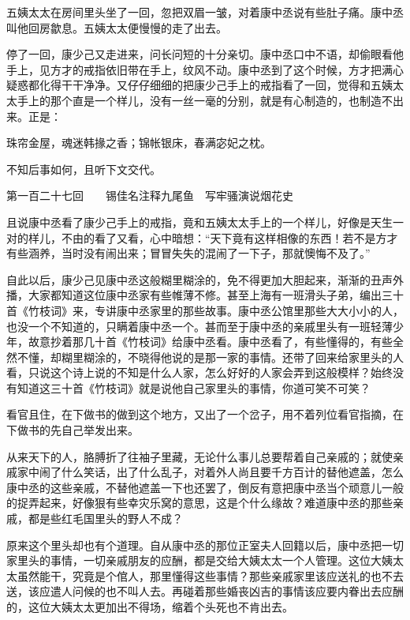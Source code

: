 \documentclass[12pt,UTF8]{ctexbook}
\begin{document}
{{{五姨太太在房间里头坐了一回，忽把双眉一皱，对着康中丞说有些肚子痛。康中丞叫他回房歙息。五姨太太便慢慢的走了出去。

停了一回，康少己又走进来，问长问短的十分亲切。康中丞口中不语，却偷眼看他手上，见方才的戒指依旧带在手上，纹风不动。康中丞到了这个时候，方才把满心疑惑都化得干干净净。又仔仔细细的把康少己手上的戒指看了一回，觉得和五姨太太手上的那个直是一个样儿，没有一丝一毫的分别，就是有心制造的，也制造不出来。正是：

珠帘金屋，魂迷韩掾之香；锦帐银床，春满宓妃之枕。

不知后事如何，且听下文交代。





第一百二十七回　　锡佳名注释九尾鱼　写牢骚演说烟花史





且说康中丞看了康少己手上的戒指，竟和五姨太太手上的一个样儿，好像是天生一对的样儿，不由的看了又看，心中暗想：“天下竟有这样相像的东西！若不是方才有些涵养，当时没有闹出来；冒冒失失的混闹了一下子，那就懊悔不及了。”

自此以后，康少己见康中丞这般糊里糊涂的，免不得更加大胆起来，渐渐的丑声外播，大家都知道这位康中丞家有些帷薄不修。甚至上海有一班滑头子弟，编出三十首《竹枝词》来，专讲康中丞家里的那些故事。康中丞公馆里那些大大小小的人，也没一个不知道的，只瞒着康中丞一个。甚而至于康中丞的亲戚里头有一班轻薄少年，故意抄着那几十首《竹枝词》给康中丞看。康中丞看了，有些懂得的，有些全然不懂，却糊里糊涂的，不晓得他说的是那一家的事情。还带了回来给家里头的人看，只说这个诗上说的不知是什么人家，怎么好好的人家会弄到这般模样？始终没有知道这三十首《竹枝词》就是说他自己家里头的事情，你道可笑不可笑？

看官且住，在下做书的做到这个地方，又出了一个岔子，用不着列位看官指摘，在下做书的先自己举发出来。

从来天下的人，胳膊折了往袖子里藏，无论什么事儿总要帮着自己亲戚的；就使亲戚家中闹了什么笑话，出了什么乱子，对着外人尚且要千方百计的替他遮盖，怎么康中丞的这些亲戚，不替他遮盖一下也还罢了，倒反有意把康中丞当个顽意儿一般的捉弄起来，好像狠有些幸灾乐窝的意思，这是个什么缘故？难道康中丞的那些亲戚，都是些红毛国里头的野人不成？

原来这个里头却也有个道理。自从康中丞的那位正室夫人回籍以后，康中丞把一切家里头的事情，一切亲戚朋友的应酬，都是交给大姨太太一个人管理。这位大姨太太虽然能干，究竟是个倌人，那里懂得这些事情？那些亲戚家里该应送礼的也不去送，该应遣人问候的也不叫人去。再碰着那些婚丧凶吉的事情该应要内眷出去应酬的，这位大姨太太更加出不得场，缩着个头死也不肯出去。

}}}
\end{document}
